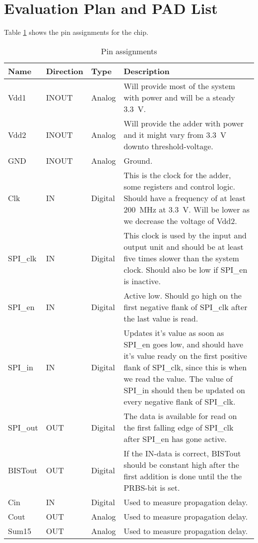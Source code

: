 \section{Evaluation Plan and PAD List}
Table \ref{tab:pins} shows the pin assignments for the chip.

\begin{table}[H]
  \caption{Pin assignments}
  \centering
  \begin{tabularx}{\linewidth}{|l|l|l|X|}
    \hline
    \textbf{Name} & \textbf{Direction} & \textbf{Type} & \textbf{Description} \\ \hline
    Vdd1 & INOUT & Analog & Will provide most of the system with power and will be a steady \SI{3.3}{\volt}. \\ \hline
    Vdd2 & INOUT & Analog & Will provide the adder with power and it might vary from \SI{3.3}{\volt} downto threshold-voltage. \\ \hline
    GND &  INOUT & Analog & Ground. \\ \hline
    Clk & IN & Digital & This is the clock for the adder, some registers and control logic. Should have a frequency of at least \SI{200}{\mega\hertz} at \SI{3.3}{\volt}. Will be lower as we decrease the voltage of Vdd2. \\ \hline
    SPI\_clk & IN & Digital & This clock is used by the input and output unit and should be at least five times slower than the system clock. Should also be low if SPI\_en is inactive. \\ \hline
    SPI\_en & IN & Digital & Active low. Should go high on the first negative flank of SPI\_clk after the last value is read. \\ \hline
    SPI\_in & IN & Digital & Updates it's value as soon as SPI\_en goes low, and should have it's value ready on the first positive flank of SPI\_clk, since this is when we read the value. The value of SPI\_in should then be updated on every negative flank of SPI\_clk. \\ \hline
    SPI\_out & OUT & Digital & The data is available for read on the first falling edge of SPI\_clk after SPI\_en has gone active. \\ \hline
    BISTout & OUT & Digital & If the IN-data is correct, BISTout should be constant high after the first addition is done until the the PRBS-bit is set.  \\ \hline
    Cin & IN & Digital & Used to measure propagation delay. \\ \hline
    Cout & OUT & Analog & Used to measure propagation delay. \\ \hline
    Sum15 & OUT & Analog & Used to measure propagation delay. \\ \hline
  \end{tabularx}
  \label{tab:pins}
\end{table}
